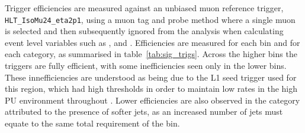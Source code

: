 Trigger efficiencies are measured against an unbiased muon reference trigger,
\\\verb!HLT_IsoMu24_eta2p1!, using a muon tag and probe method where a
single muon is selected and then subsequently ignored from the analysis when 
calculating event level variables such as \HT, \mht and \alphat. Efficiencies 
are measured for each \HT bin and for each \nj category, as summarised in 
table~\ref{tab:sig_trigs}. Across the higher \HT 
bins the triggers are fully efficient, with some inefficiencies seen only in the
lower \HT bins. These innefficiencies are understood as being due to the L1 seed
trigger used for this region, which had high thresholds in order to maintain 
low rates in the high PU environment throughout \runone. Lower 
efficiencies are also observed in the \njhigh category attributed to the presence of 
softer jets, as an increased number of jets must equate to the same total \HT 
requirement of the bin.

